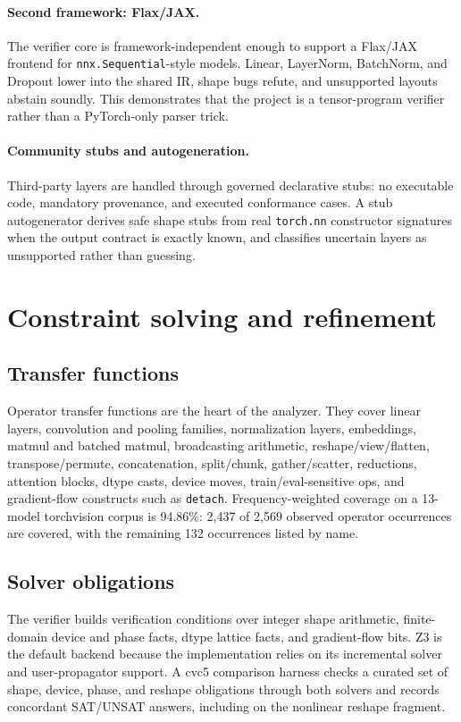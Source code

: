 \documentclass[11pt]{article}
\begin{document}
\paragraph{Second framework: Flax/JAX.}
The verifier core is framework-independent enough to support a Flax/JAX
frontend for \texttt{nnx.Sequential}-style models.  Linear, LayerNorm,
BatchNorm, and Dropout lower into the shared IR, shape bugs refute, and
unsupported layouts abstain soundly.  This demonstrates that the project is a
tensor-program verifier rather than a PyTorch-only parser trick.

\paragraph{Community stubs and autogeneration.}
Third-party layers are handled through governed declarative stubs: no executable
code, mandatory provenance, and executed conformance cases.  A stub autogenerator
derives safe shape stubs from real \texttt{torch.nn} constructor signatures when
the output contract is exactly known, and classifies uncertain layers as
unsupported rather than guessing.

\section{Constraint solving and refinement}

\subsection{Transfer functions}

Operator transfer functions are the heart of the analyzer.  They cover linear
layers, convolution and pooling families, normalization layers, embeddings,
matmul and batched matmul, broadcasting arithmetic, reshape/view/flatten,
transpose/permute, concatenation, split/chunk, gather/scatter, reductions,
attention blocks, dtype casts, device moves, train/eval-sensitive ops, and
gradient-flow constructs such as \texttt{detach}.  Frequency-weighted coverage
on a 13-model torchvision corpus is 94.86\%: 2,437 of 2,569 observed operator
occurrences are covered, with the remaining 132 occurrences listed by name.

\subsection{Solver obligations}

The verifier builds verification conditions over integer shape arithmetic,
finite-domain device and phase facts, dtype lattice facts, and gradient-flow
bits.  Z3 is the default backend because the implementation relies on its
incremental solver and user-propagator support.  A cvc5 comparison harness
checks a curated set of shape, device, phase, and reshape obligations through
both solvers and records concordant SAT/UNSAT answers, including on the
nonlinear reshape fragment.
\end{document}
